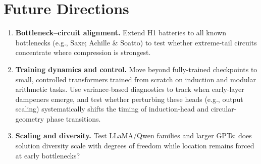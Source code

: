 \section{Future Directions}

\begin{enumerate}
    \item \textbf{Bottleneck–circuit alignment.} Extend H1 batteries to all known bottlenecks (e.g., Saxe; Achille \& Soatto) to test whether extreme-tail circuits concentrate where compression is strongest.
    \item \textbf{Training dynamics and control.} Move beyond fully-trained checkpoints to small, controlled transformers trained from scratch on induction and modular arithmetic tasks. Use variance-based diagnostics to track when early-layer dampeners emerge, and test whether perturbing these heads (e.g., output scaling) systematically shifts the timing of induction-head and circular-geometry phase transitions.
    \item \textbf{Scaling and diversity.} Test LLaMA/Qwen families and larger GPTs: does solution diversity scale with degrees of freedom while location remains forced at early bottlenecks?
\end{enumerate}
